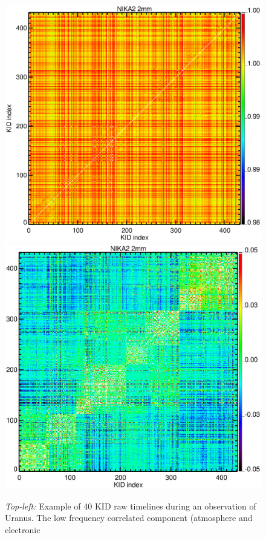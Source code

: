 \begin{figure}[ht!]
\begin{center}
\includegraphics[clip, angle=0, scale=0.4]{Figures/matrix_2mm_raw.eps}
\includegraphics[clip, angle=0, scale=0.4]{Figures/matrix_2mm_decorr.eps}
\caption[Example of Time-Ordered-Information]{\emph{Top-left:} Example of 40 KID raw timelines during an observation
  of Uranus. The low frequency correlated component (atmosphere and electronic
}
\end{center}
\end{figure}
